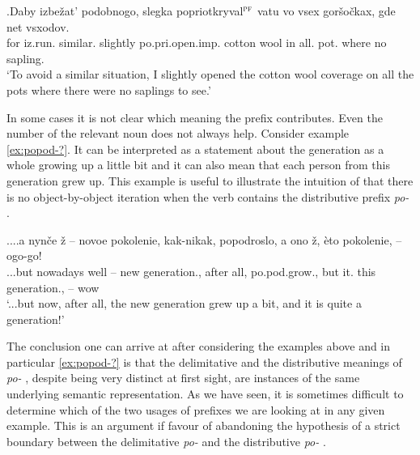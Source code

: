 \exg.\label{ex:popriotkryval:pf2}Daby izbe\v{z}at' podobnogo, slegka popriotkryval$^{\textsc{pf}}$ vatu vo vsex gor\v{s}o\v{c}kax, gde net vsxodov.\\
for iz.run. similar. slightly po.pri.open.imp. {cotton wool} in all. pot. where no sapling.\\
\trans `To avoid a similar situation, I slightly opened the cotton wool coverage on all the pots where there were no saplings to see.'\\

In some cases it is not clear which meaning the prefix contributes. Even the number of the relevant noun does not always help. Consider example \ref{ex:popod-?}. It can be interpreted as a statement about the generation as a whole growing up a little bit and it can also mean that each person from this generation grew up. This example is useful to illustrate the intuition of \citet{Isachenko:60} that there is no object-by-object iteration when the verb contains the distributive  prefix \textit{po-}  .

\exg.\label{ex:popod-?}...a nyn\v{c}e \v{z} – novoe pokolenie, kak-nikak, popodroslo, a ono \v{z}, \`{e}to pokolenie, -- ogo-go!\\
...but nowadays well -- new generation., {after all}, po.pod.grow., but it. {} this generation., -- wow
\\
\trans `...but now, after all, the new generation grew up a bit, and it is quite a generation!'
 
The conclusion one can arrive at after considering the examples above and in particular \ref{ex:popod-?} is that the delimitative  and the distributive  meanings of \textit{po-}  , despite being very distinct at first sight, are instances of the same underlying semantic representation. As we have seen, it is sometimes difficult to determine which of the two usages of prefixes we are looking at in any given example. This is an argument if favour of abandoning the hypothesis of a strict boundary between the delimitative  \textit{po-}   and the distributive  \textit{po-}  .

